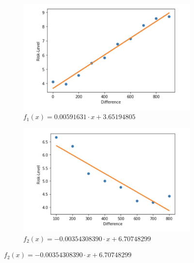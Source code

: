 \begin{figure}[ht]
\begin{subfigure}{0.5\textwidth}
    \centering
    \includegraphics[width=1\linewidth]{Bilder/risk_level_diffrence_200steps}
    \caption{$f_1(x)=0.00591631\cdot x+3.65194805$}
    \label{fig:10}
\end{subfigure}
\begin{subfigure}{0.5\textwidth}
    \centering
    \includegraphics[width=1\linewidth]{Bilder/risk_level_diffrence_100steps}
    \caption{$f_2(x)=-0.00354308390\cdot x+6.70748299$}
    \label{fig:11}
\end{subfigure}
\end{figure}

